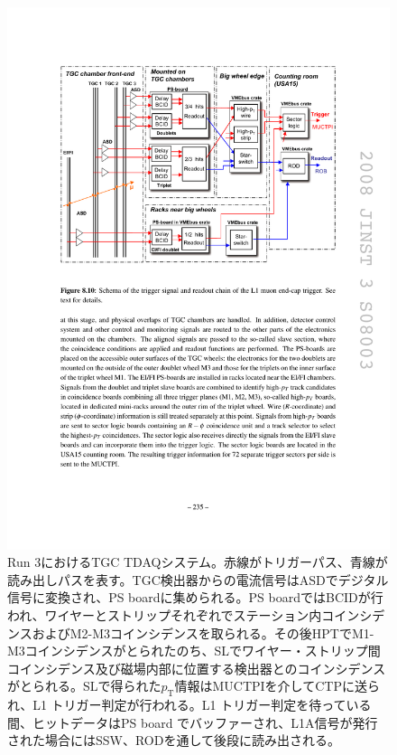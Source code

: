 \begin{figure} 
\centering
\includegraphics[width=16cm]{fig/Intro/TGC_run3tdaq.pdf}
\caption[Run 3におけるTGC TDAQシステム]{Run 3におけるTGC TDAQシステム。赤線がトリガーパス、青線が読み出しパスを表す。TGC検出器からの電流信号はASDでデジタル信号に変換され、PS boardに集められる。PS boardではBCIDが行われ、ワイヤーとストリップそれぞれでステーション内コインシデンスおよびM2-M3コインシデンスを取られる。その後HPTでM1-M3コインシデンスがとられたのち、SLでワイヤー・ストリップ間コインシデンス及び磁場内部に位置する検出器とのコインシデンスがとられる。SLで得られた$p_\mathrm{T}$情報はMUCTPIを介してCTPに送られ、L1 トリガー判定が行われる。L1 トリガー判定を待っている間、ヒットデータはPS board でバッファーされ、L1A信号が発行された場合にはSSW、RODを通して後段に読み出される。}
\label{TGC_run3tdaq}
\end{figure}

